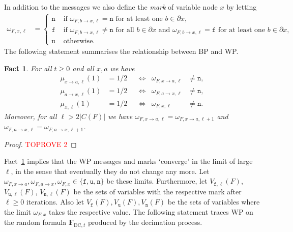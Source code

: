 \documentclass[10pt,reqno]{amsart}
\numberwithin{equation}{section}
\renewcommand{\vec}[1]{\boldsymbol{#1}}
\newcommand{\FDC}[1]{\PHI_{\mathrm{DC},{#1}}}
\newcommand{\frozen}{\mathtt{f}}
\newcommand{\unfrozen}{\mathtt{u}}
\newcommand{\nll}{\mathtt{n}}
\newcommand{\fzn}{\frozen}
\newcommand{\uzn}{\unfrozen}
\newcommand\PHI{\vec F}
\newtheorem{fact}[definition]{Fact}
\begin{document}
In addition to the messages we also define the {\em mark} of variable node $x$ by letting
\begin{align}\label{eqmarks}
	\omega_{F,x,\ell}&=\begin{cases}
		\nll&\mbox{ if }\omega_{F,b\to x,\ell}=\nll\mbox{ for at least one }b\in\partial x,\\
		\fzn&\mbox{ if }\omega_{F,b\to x,\ell}\neq\nll\mbox{ for all }b\in\partial x
		\mbox{ and }\omega_{F,b\to x,\ell}=\fzn\mbox{ for at least one }b\in\partial x,\\
		\uzn&\mbox{ otherwise}.
		\end{cases}
\end{align}
The following statement summarises the relationship between BP and WP.

\begin{fact}\label{fact_wp}
	For all $t\geq0$ and all $x,a$ we have
\begin{align}\label{eqfact_wp1}
		\mu_{x\to a,\ell}(1)&=1/2&&\Leftrightarrow&\omega_{F,x\to a,\ell}&\neq\nll,\\
		\mu_{a\to x,\ell}(1)&=1/2&&\Leftrightarrow&\omega_{F,a\to x,\ell}&\neq\nll,\label{eqfact_wp2}\\
		\mu_{x,\ell}(1)&=1/2&&\Leftrightarrow&\omega_{F,x,\ell}&\neq\nll.\label{eqfact_wp3}
		\end{align}
	Moreover, for all $\ell>2|C(F)|$ we have $\omega_{F,x\to a,\ell}=\omega_{F,x\to a,\ell+1}$ and $\omega_{F,a\to x,\ell}=\omega_{F,a\to x,\ell+1}$.
\end{fact}
\begin{proof}\textcolor{red}{TOPROVE 2}\end{proof}

Fact~\ref{fact_wp} implies that the WP messages and marks `converge' in the limit of large $\ell$, in the sense that eventually they do not change any more.
Let $\omega_{F,x\to a},\omega_{F,a\to x},\omega_{F,x}\in\{\fzn,\uzn,\nll\}$ be these limits.
Furthermore, let $V_{\fzn,\ell}(F)$, $V_{\uzn,\ell}(F)$, $V_{\nll,\ell}(F)$ be the sets of variables with the respective mark after $\ell\geq0$ iterations. 
Also let $V_{\fzn}(F),V_{\uzn}(F),V_{\nll}(F)$ be the sets of variables where the limit $\omega_{F,x}$ takes the respective value.
The following statement traces WP on the random formula $\FDC{t}$ produced by the decimation process.
\end{document}
